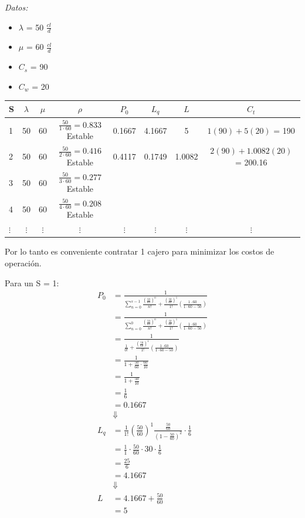 \documentclass{templateNote}
\begin{document}
\textit{Datos:}
\begin{itemize}
    \item $\lambda$ = 50 $\frac{cl}{d}$
    \item $\mu$ = 60 $\frac{cl}{d}$
    \item $C_s$ = 90
    \item $C_w$ = 20
\end{itemize}

\begin{table}[h]
    \centering
    \begin{tabular}{|l|c|c|c|c|c|c|c|}
    \hline
    S & $\lambda$ & $\mu$ &$\rho$ & $P_0$ & $L_q$ & $L$ & $C_t$ \\ \hline
    1  & 50 & 60 & $\frac{50}{1\cdot60} = 0.833$ Estable & 0.1667 & 4.1667 & 5 & $1(90)+5(20)$ = 190 \\
    2  & 50 & 60 & $\frac{50}{2\cdot60} = 0.416$ Estable & 0.4117 & 0.1749 & 1.0082 & $2(90)+1.0082(20)$ = 200.16 \\
    3  & 50 & 60 & $\frac{50}{3\cdot60} = 0.277$ Estable &  &  &  &  \\
    4  & 50 & 60 & $\frac{50}{4\cdot60} = 0.208$ Estable &  &  &  &  \\
    $\vdots$ & $\vdots$ & $\vdots$ & $\vdots$ & $\vdots$ & $\vdots$ & $\vdots$ & $\vdots$ \\
    \hline
    \end{tabular}
\end{table}

Por lo tanto es conveniente contratar 1 cajero para minimizar los costos de operación.

Para un S = 1:
    \begin{align*}
        P_0 &= \frac{1}{\sum_{n=0}^{s-1} \frac{(\frac{50}{60})^n}{n!} + \frac{(\frac{50}{60})^1}{1!} (\frac{1\cdot60}{1\cdot60-50})} \\
        &= \frac{1}{\sum_{n=0}^{0} \frac{(\frac{50}{60})^n}{n!} + \frac{(\frac{50}{60})^1}{1!} (\frac{1\cdot60}{1\cdot60-50})} \\
        &= \frac{1}{\frac{1}{0!} + \frac{(\frac{50}{60})^1}{1!} (\frac{1\cdot60}{1\cdot60-50})} \\
        &= \frac{1}{1 + \frac{50}{60} \cdot \frac{60}{10}} \\
        &= \frac{1}{1 + \frac{50}{10}} \\
        &= \frac{1}{6} \\
        &= 0.1667 \\
        &\Downarrow \\
        L_q &= \frac{1}{1!} (\frac{50}{60})^1 \frac{\frac{50}{60}}{(1-\frac{50}{60})^2} \cdot \frac{1}{6} \\
        &= \frac{1}{1} \cdot \frac{50}{60} \cdot 30 \cdot \frac{1}{6} \\
        &= \frac{25}{6} \\
        &= 4.1667 \\ 
        &\Downarrow \\
        L &= 4.1667 + \frac{50}{60}\\
        &= 5
    \end{align*}
\end{document}
